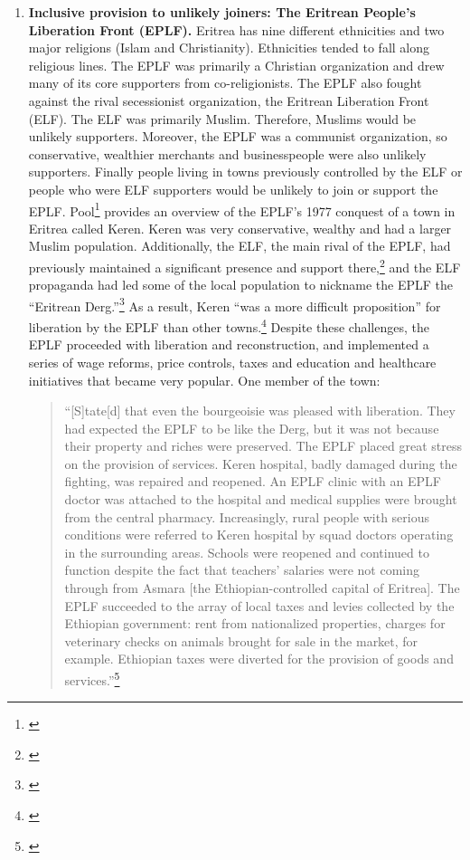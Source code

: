 \documentclass[12pt, letterpaper]{article}
\begin{document}
\begin{enumerate}
\item \textbf{Inclusive provision to unlikely joiners: The Eritrean People's Liberation Front (EPLF).} Eritrea has nine different ethnicities and two major religions (Islam and Christianity). Ethnicities tended to fall along religious lines. The EPLF was primarily a Christian organization and drew many of its core supporters from co-religionists. The EPLF also fought against the rival secessionist organization, the Eritrean Liberation Front (ELF). The ELF was primarily Muslim. Therefore, Muslims would be unlikely supporters. Moreover, the EPLF was a communist organization, so conservative, wealthier merchants and businesspeople were also unlikely supporters. Finally people living in towns previously controlled by the ELF or people who were ELF supporters would be unlikely to join or support the EPLF. Pool\footnote{\citealt{pool2001guerrillas}} provides an overview of the EPLF's 1977 conquest of a town in Eritrea called Keren. Keren was very conservative, wealthy and had a larger Muslim population. Additionally, the ELF, the main rival of the EPLF, had previously maintained a significant presence and support there,\footnote{\citealt[121]{pool2001guerrillas}} and the ELF propaganda had led some of the local population to nickname the EPLF the ``Eritrean Derg.''\footnote{\citealt[123]{pool2001guerrillas}} As a result, Keren ``was a more difficult proposition'' for liberation by the EPLF than other towns.\footnote{\citealt[123]{pool2001guerrillas}} Despite these challenges, the EPLF proceeded with liberation and reconstruction, and implemented a series of wage reforms, price controls, taxes and education and healthcare initiatives that became very popular. One member of the town:
\begin{quote}
``[S]tate[d] that even the bourgeoisie was pleased with liberation. They had expected the EPLF to be like the Derg, but it was not because their property and riches were preserved. The EPLF placed great stress on the provision of services. Keren hospital, badly damaged during the fighting, was repaired and reopened. An EPLF clinic with an EPLF doctor was attached to the hospital and medical supplies were brought from the central pharmacy. Increasingly, rural people with serious conditions were referred to Keren hospital by squad doctors operating in the surrounding areas. Schools were reopened and continued to function despite the fact that teachers' salaries were not coming through from Asmara [the Ethiopian-controlled capital of Eritrea]. The EPLF succeeded to the array of local taxes and levies collected by the Ethiopian government: rent from nationalized properties, charges for veterinary checks on animals brought for sale in the market, for example. Ethiopian taxes were diverted for the provision of goods and services.''\footnote{\citealt[124-5]{pool2001guerrillas}}

\end{quote}
\end{enumerate}
\end{document}
